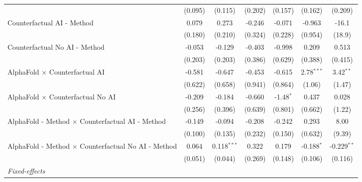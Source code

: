 \begin{tabular}{lcccccc}
                                                              & (0.095)       & (0.115)       & (0.202)      & (0.157)       & (0.162)      & (0.209)\\   
   Counterfactual AI - Method                                 & 0.079         & 0.273         & -0.246       & -0.071        & -0.963       & -16.1\\   
                                                              & (0.180)       & (0.210)       & (0.324)      & (0.228)       & (0.954)      & (18.9)\\   
   Counterfactual No AI - Method                              & -0.053        & -0.129        & -0.403       & -0.998        & 0.209        & 0.513\\   
                                                              & (0.203)       & (0.203)       & (0.386)      & (0.629)       & (0.388)      & (0.415)\\   
   AlphaFold $\times$ Counterfactual AI                       & -0.581        & -0.647        & -0.453       & -0.615        & 2.78$^{***}$ & 3.42$^{**}$\\   
                                                              & (0.622)       & (0.658)       & (0.941)      & (0.864)       & (1.06)       & (1.47)\\   
   AlphaFold $\times$ Counterfactual No AI                    & -0.209        & -0.184        & -0.660       & -1.48$^{*}$   & 0.437        & 0.028\\   
                                                              & (0.256)       & (0.396)       & (0.639)      & (0.801)       & (0.662)      & (1.22)\\   
   AlphaFold - Method $\times$ Counterfactual AI - Method     & -0.149        & -0.094        & -0.208       & -0.242        & 0.293        & 8.00\\   
                                                              & (0.100)       & (0.135)       & (0.232)      & (0.150)       & (0.632)      & (9.39)\\   
   AlphaFold - Method $\times$ Counterfactual No AI - Method  & 0.064         & 0.118$^{***}$ & 0.322        & 0.179         & -0.188$^{*}$ & -0.229$^{**}$\\   
                                                              & (0.051)       & (0.044)       & (0.269)      & (0.148)       & (0.106)      & (0.116)\\   
   \midrule
   \emph{Fixed-effects}\\

\end{tabular}
